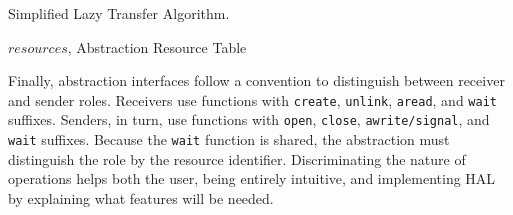 			\begin{algorithm}
				\caption{Simplified Lazy Transfer Algorithm.}%
				\label{alg:lazy-transfer}%
				\begin{algorithmic}[1]
				\Require $resources$, Abstraction Resource Table


						\Else
						\EndIf
					\EndProcedure%


						\Else
						\EndIf
					\EndProcedure%


						                                
					\EndProcedure%

				\end{algorithmic}%

			\end{algorithm}


			Finally, abstraction interfaces follow a convention to distinguish between receiver and sender roles. Receivers use functions with \texttt{create}, \texttt{unlink}, \texttt{aread}, and \texttt{wait} suffixes. Senders, in turn, use functions with \texttt{open}, \texttt{close}, \texttt{awrite/signal}, and \texttt{wait} suffixes. Because the \texttt{wait} function is shared, the abstraction must distinguish the role by the resource identifier. Discriminating the nature of operations helps both the user, being entirely intuitive, and implementing HAL by explaining what features will be needed.

